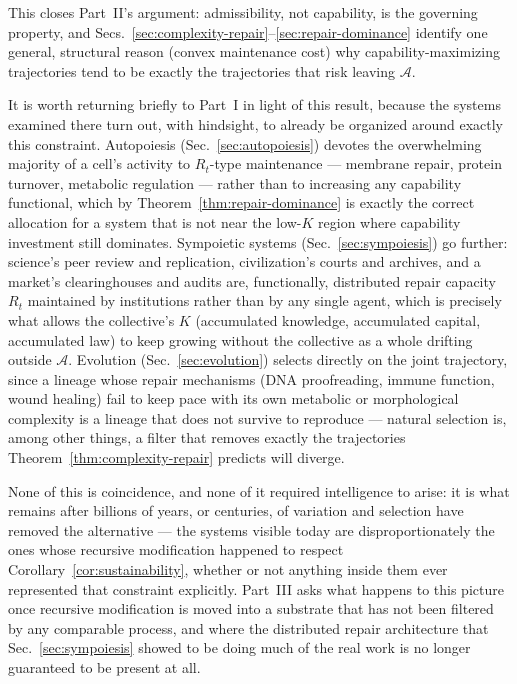 \documentclass[12pt,a4paper]{article}
\theoremstyle{plain}
\theoremstyle{definition}
\theoremstyle{remark}
\newcommand{\Adm}{\mathcal{A}}
\begin{document}
This closes Part~II's argument: admissibility, not capability, is the governing property, and Secs.~\ref{sec:complexity-repair}--\ref{sec:repair-dominance} identify one general, structural reason (convex maintenance cost) why capability-maximizing trajectories tend to be exactly the trajectories that risk leaving $\Adm$.

It is worth returning briefly to Part~I in light of this result, because the systems examined there turn out, with hindsight, to already be organized around exactly this constraint. Autopoiesis (Sec.~\ref{sec:autopoiesis}) devotes the overwhelming majority of a cell's activity to $R_t$-type maintenance — membrane repair, protein turnover, metabolic regulation — rather than to increasing any capability functional, which by Theorem~\ref{thm:repair-dominance} is exactly the correct allocation for a system that is not near the low-$K$ region where capability investment still dominates. Sympoietic systems (Sec.~\ref{sec:sympoiesis}) go further: science's peer review and replication, civilization's courts and archives, and a market's clearinghouses and audits are, functionally, distributed repair capacity $R_t$ maintained by institutions rather than by any single agent, which is precisely what allows the collective's $K$ (accumulated knowledge, accumulated capital, accumulated law) to keep growing without the collective as a whole drifting outside $\Adm$. Evolution (Sec.~\ref{sec:evolution}) selects directly on the joint trajectory, since a lineage whose repair mechanisms (DNA proofreading, immune function, wound healing) fail to keep pace with its own metabolic or morphological complexity is a lineage that does not survive to reproduce — natural selection is, among other things, a filter that removes exactly the trajectories Theorem~\ref{thm:complexity-repair} predicts will diverge.

None of this is coincidence, and none of it required intelligence to arise: it is what remains after billions of years, or centuries, of variation and selection have removed the alternative — the systems visible today are disproportionately the ones whose recursive modification happened to respect Corollary~\ref{cor:sustainability}, whether or not anything inside them ever represented that constraint explicitly. Part~III asks what happens to this picture once recursive modification is moved into a substrate that has not been filtered by any comparable process, and where the distributed repair architecture that Sec.~\ref{sec:sympoiesis} showed to be doing much of the real work is no longer guaranteed to be present at all.
\end{document}
